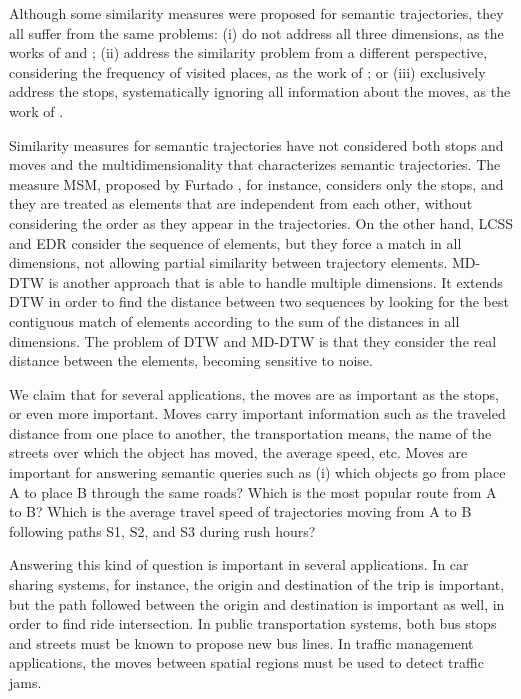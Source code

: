 \documentclass[12pt]{article}
\begin{document}
Although some similarity measures were proposed for semantic trajectories, they all suffer from the same problems: (i) do not address all three dimensions, as the works of \cite{Kang:2009:SMT:1529282.1529580} and \cite{Liu:2012:SMM:2442968.2442971}; (ii) address the similarity problem from a different perspective, considering the frequency of visited places, as the work of \cite{Ying:2010:MUS:1867699.1867703}; or (iii) exclusively address the stops, systematically ignoring all information about the moves, as the work of \cite{Furtado:TGIS12156}.

Similarity measures for semantic trajectories have not considered both stops and moves and the multidimensionality that characterizes semantic trajectories. The measure MSM, proposed by Furtado \cite{Furtado:TGIS12156}, for instance, considers only the stops, and they are treated as elements that are independent from each other, without considering the order as they appear in the trajectories. On the other hand, LCSS\cite{vlachos2002discovering} and EDR\cite{Chen:2005:RFS:1066157.1066213} consider the sequence of elements, but they force a match in all dimensions, not allowing partial similarity between trajectory elements. MD-DTW \cite{ten2007multi} is another approach that is able to handle multiple dimensions. It extends DTW \cite{berndt1994using} in order to find the distance between two sequences by looking for the best contiguous match of elements according to the sum of the distances in all dimensions. The problem of DTW and MD-DTW is that they consider the real distance between the elements, becoming sensitive to noise.

We claim that for several applications, the moves are as important as the stops, or even more important. Moves carry important information such as the traveled distance from one place to another, the transportation means, the name of the streets over which the object has moved, the average speed, etc. Moves are important for answering semantic queries such as (i) which objects go from place A to place B through the same roads? Which is the most popular route from A to B? Which is the average travel speed of trajectories moving from A to B following paths S1, S2, and S3 during rush hours?

Answering this kind of question is important in several applications. In car sharing systems, for instance, the origin and destination of the trip is important, but the path followed between the origin and destination is important as well, in order to find ride intersection. In public transportation systems, both bus stops and streets must be known to propose new bus lines. In traffic management applications, the moves between spatial regions must be used to detect traffic jams.
\end{document}
